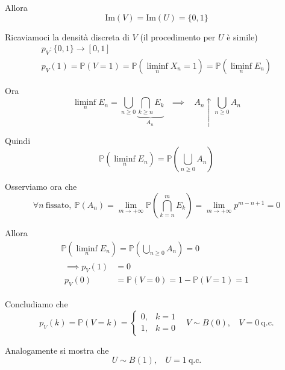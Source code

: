 \begin{enumerate}
Allora\begin{equation*}
\mathrm{Im}( V) =\mathrm{Im}( U) =\{0,1\}
\end{equation*}

Ricaviamoci la densità discreta di $V$ (il procedimento per $U$ è simile)\begin{gather*}
p_{V} :\{0,1\}\rightarrow [ 0,1]\\
p_{V}( 1) =\mathbb{P}( V=1) =\mathbb{P}\left(\liminf _{n} X_{n} =1\right) =\mathbb{P}\left(\liminf _{n} E_{n}\right)
\end{gather*}

Ora\begin{equation*}
\liminf _{n} E_{n} =\bigcup _{n\geq 0}\underbrace{\bigcap\limits _{k\geq n} E_{k}}_{A_{n} \ } \ \ \ \implies \ \ \ \ A_{n} \uparrow \bigcup _{n\geq 0} A_{n}
\end{equation*}

Quindi\begin{equation*}
\mathbb{P}\left(\liminf _{n} E_{n}\right) =\mathbb{P}\left(\bigcup _{n\geq 0} A_{n}\right)
\end{equation*}

Osserviamo ora che\begin{equation*}
\forall n\ \text{fissato} ,\ \mathbb{P}\left( A_{n}\right) =\lim _{m\rightarrow +\infty }\mathbb{P}\left(\bigcap\limits _{k=n}^{m} E_{k}\right) =\lim _{m\rightarrow +\infty } p^{m-n+1} =0
\end{equation*}

Allora\begin{gather*}
\mathbb{P}\left(\liminf _{n} E_{n}\right) =\mathbb{P}\left(\bigcup _{n\geq 0} A_{n}\right) =0\\
\begin{aligned}
\implies p_{V}( 1) & =0\\
p_{V}( 0) & =\mathbb{P}( V=0) =1-\mathbb{P}( V=1) =1
\end{aligned}
\end{gather*}

Concludiamo che\begin{equation*}
p_{V}\left( k\right) =\mathbb{P}\left( V=k\right) =\begin{cases}
0, & k=1\\
1, & k=0
\end{cases} \ \ \ \ V\sim B\left( 0\right) ,\ \ \ \ V=0\ \text{q.c.}
\end{equation*}

Analogamente si mostra che\begin{equation*}
U\sim B( 1) ,\ \ \ \ U=1\ \text{q.c.}
\end{equation*}
\end{enumerate}
